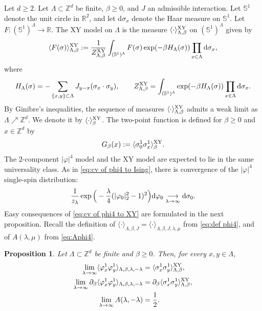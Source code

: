 \documentclass[11pt,a4paper]{article}
\numberwithin{equation}{section}
\theoremstyle{plain}
\newtheorem{Prop}[Thm]{Proposition}
\theoremstyle{definition}
\newcommand\1{\mathds{1}}
\begin{document}
	Let $d\geq 2$. Let $\Lambda\subset \mathbb Z^d$ be finite, $\beta\geq 0$, and $J$ an admissible interaction.
Let $\mathbb S^1$ denote the unit circle in $\mathbb R^2$,
and let $\mathrm d \sigma_x$ denote the Haar measure on $\mathbb S^1$.
Let $F: (\mathbb S^1)^\Lambda\rightarrow \mathbb R$.
    The XY model on $\Lambda$ is the measure $\langle \cdot \rangle_{\Lambda,\beta}^{\rm XY}$ on $(\mathbb S^1)^\Lambda$ given by
	\begin{equation}
		\langle F(\sigma)\rangle_{\Lambda,\beta}^{\rm XY}:=\frac{1}{Z^{\rm XY}_{\Lambda,\beta}}\int_{(\mathbb S^1)^\Lambda} F(\sigma)\exp(-\beta H_{\Lambda}(\sigma)) \prod_{x\in \Lambda}\mathrm d \sigma_x,
	\end{equation}
	where
	\begin{equation}
		H_{\Lambda}(\sigma)=-\sum_{\{x,y\}\subset \Lambda}J_{y-x}(\sigma_x \cdot \sigma_y), \qquad Z_{\Lambda,\beta}^{\rm XY}=\int_{(\mathbb S^1)^\Lambda}\exp(-\beta H_{\Lambda}(\sigma)) \prod_{x\in \Lambda}\mathrm d \sigma_x.
	\end{equation}
By Ginibre's inequalities, the sequence of measures $\langle \cdot \rangle_{\Lambda,\beta}^{\rm XY}$ admits a weak limit as $\Lambda \nearrow \mathbb Z^d$. We denote it by $\langle \cdot\rangle_\beta^{\rm XY}$. The two-point function is defined for $\beta\geq 0$ and $x\in \mathbb Z^d$ by
\begin{equation}
	G_\beta(x):=\langle \sigma^1_0\sigma^1_x\rangle_{\beta}^{\rm XY}.
\end{equation}
The $2$-component $|\varphi|^4$ model and the XY model are expected to lie in the same universality class.
As in \eqref{eq:cv of phi4 to Ising}, there is convergence of the
$|\varphi|^4$ single-spin distribution:
\begin{equation}\label{eq:cv of phi4 to XY}
\frac{1}{z_\lambda}\exp\Big(-\frac{\lambda}{4}(|\varphi_0|_2^2-1)^2\Big){\rm d}\varphi_0\underset{\lambda \rightarrow \infty}{\longrightarrow} \mathrm d \sigma_0.
\end{equation}
Easy consequences of \eqref{eq:cv of phi4 to XY} are formulated in the
next proposition. Recall the definition of $\langle \cdot\rangle_{\Lambda,\beta,J}=\langle \cdot\rangle_{\Lambda,\beta,J,\lambda,\mu}$ from \eqref{eq:def phi4},
and of $A(\lambda,\mu)$ from \eqref{eq:Aphi4}.

\begin{Prop}\label{prop:cv of phi4 to XY}
Let $\Lambda\subset \mathbb Z^d$ be finite and $\beta\geq 0$. Then, for every $x,y\in \Lambda$,
\begin{align}
	\lim_{\lambda\to\infty}
\langle \varphi^1_x\varphi^1_y\rangle_{\Lambda,\beta,\lambda,-\lambda}&=\langle \sigma^1_x\sigma^1_y\rangle_{\Lambda,\beta}^{\rm XY},
	\\
\lim_{\lambda\to\infty}
	\partial_\beta\langle \varphi^1_x\varphi^1_y\rangle_{\Lambda,\beta,\lambda,-\lambda}&= \partial_\beta\langle \sigma^1_x\sigma^1_y\rangle_{\Lambda,\beta}^{\rm XY},
	\\
\lim_{\lambda\to\infty}
A(\lambda,-\lambda)&= \frac12.\label{eq: cv A XY}
\end{align}

\end{Prop}
\end{document}

